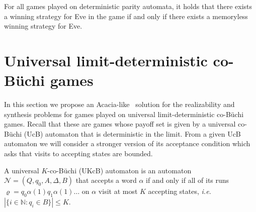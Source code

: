\documentclass[draft]{llncs}
\let\rho\varrho
\newcommand{\st}{\mathrel{:}}
\newcommand{\ie}{\textit{i.e.}\xspace}
\newcommand{\eve}{Eve\xspace}
\newcommand{\calN}{\mathcal{N}}
\begin{document}
\begin{proposition}
    For all games played on deterministic parity automata, it holds that there
    exists a winning strategy for \eve in the game if and only if there exists a
    memoryless winning strategy for \eve.
\end{proposition}

\section{Universal limit-deterministic co-B\"uchi games}
In this section we propose an Acacia-like~\cite{acacia} solution for the
realizability and synthesis problems for games played on universal
limit-deterministic co-B\"uchi games. Recall that these are games whose payoff
set is given by a universal co-B\"uchi (UcB) automaton that is deterministic in
the limit.
From a given UcB automaton we will consider a stronger version of its acceptance
condition which asks that visits to accepting states are bounded.

\begin{definition}
    A universal $K$-co-B\"uchi (UKcB) automaton is an automaton $\calN =
    (Q,q_0,A,\Delta,B)$ that accepts a word $\alpha$ if and only if all of its
    runs $\rho = q_0 \alpha(1) q_1 \alpha(1) \dots$
    on $\alpha$ visit at most $K$ accepting states, \ie~$|\{i \in \mathbb{N} \st
    q_i \in B\}| \le K$.
\end{definition}
\end{document}
